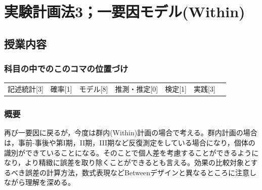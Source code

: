 \section{実験計画法3；一要因モデル(Within)}
\label{s14_design3}

\subsection{授業内容}
\subsubsection{科目の中でのこのコマの位置づけ}
\begin{tabular}[t]{ccccccc}
	記述統計[3] & 確率[1] & モデル[8] & 推測・推定[0] & 検定[1] & 実践[3]
\end{tabular}
\subsubsection{概要}
再び一要因に戻るが，今度は群内(Within)計画の場合で考える。群内計画の場合は，事前-事後や第I期，II期，III期など反復測定をしている場合になり，個体の識別ができていることになる。そのことで個人差を考慮することができるようになり，より精緻に誤差を取り除くことができるとも言える。効果の比較対象とするべき誤差の計算方法，数式表現などBetweenデザインと異なるところに注意しながら理解を深める。
